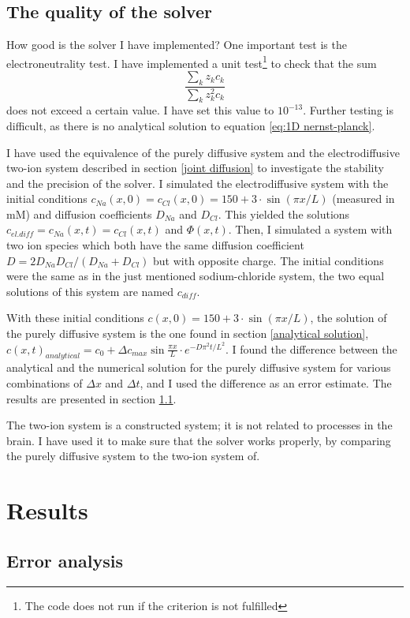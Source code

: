 \documentclass{article}
\begin{document}
\subsection{The quality of the solver}
How good is the solver I have implemented? One important test is the electroneutrality test. I have implemented a unit test\footnote{The code does not run if the criterion is not fulfilled} to check that the sum 
$$\frac{\sum_k z_k c_k}{\sum_k z_k^2 c_k}$$
does not exceed a certain value. I have set this value to $10^{-13}$. Further testing is difficult, as there is no analytical solution to equation \ref{eq:1D nernst-planck}. 


I have used the equivalence of the purely diffusive system and the electrodiffusive two-ion system described in section \ref{joint diffusion} to investigate the stability and the precision of the solver. I simulated the electrodiffusive system with the initial conditions $c_{Na}(x,0)=c_{Cl}(x,0)=150+3\cdot \sin(\pi x/L)$ (measured in mM) and diffusion coefficients $D_{Na}$ and $D_{Cl}$. This yielded the solutions $c_{el.diff} =c_{Na}(x,t)=c_{Cl}(x,t)$ and $\Phi (x,t)$. Then, I simulated a system with two ion species which both have the same diffusion coefficient $D=2D_{Na}D_{Cl}/(D_{Na}+D_{Cl})$ but with opposite charge. The initial conditions were the same as in the just mentioned sodium-chloride system, the two equal solutions of this system are named $c_{diff}$.

With these initial conditions $c(x,0)=150+3\cdot \sin(\pi x/L)$, the solution of the purely diffusive system is the one found in section \ref{analytical solution}, $c(x,t)_{analytical} =c_0 + \Delta c_{max} \sin \frac{ \pi x}{L}\cdot e^{-D\pi^2 t /L^2}$. I found the difference between the analytical and the numerical solution for the purely diffusive system for various combinations of $\Delta x$ and $\Delta t$, and I used the difference as an error estimate. The results are presented in section \ref{numerical vs analytical}. 

The two-ion system is a constructed system; it is not related to processes in the brain. I have used it to make sure that the solver works properly, by comparing the purely diffusive system to the two-ion system of. 



\section{Results}
\subsection{Error analysis}\label{numerical vs analytical}
\end{document}
